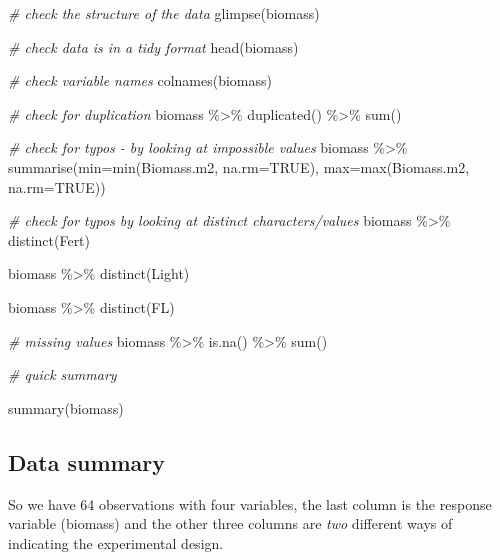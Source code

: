 \documentclass[
]{book}
\newenvironment{Shaded}{\begin{snugshade}}{\end{snugshade}}
\newcommand{\AttributeTok}[1]{\textcolor[rgb]{0.77,0.63,0.00}{#1}}
\newcommand{\CommentTok}[1]{\textcolor[rgb]{0.56,0.35,0.01}{\textit{#1}}}
\newcommand{\ConstantTok}[1]{\textcolor[rgb]{0.00,0.00,0.00}{#1}}
\newcommand{\FunctionTok}[1]{\textcolor[rgb]{0.00,0.00,0.00}{#1}}
\newcommand{\NormalTok}[1]{#1}
\newcommand{\SpecialCharTok}[1]{\textcolor[rgb]{0.00,0.00,0.00}{#1}}
\begin{document}
\begin{Shaded}
\begin{Highlighting}[]
\CommentTok{\# check the structure of the data}
\FunctionTok{glimpse}\NormalTok{(biomass)}

\CommentTok{\# check data is in a tidy format}
\FunctionTok{head}\NormalTok{(biomass)}

\CommentTok{\# check variable names}
\FunctionTok{colnames}\NormalTok{(biomass)}

\CommentTok{\# check for duplication}
\NormalTok{biomass }\SpecialCharTok{\%\textgreater{}\%} 
  \FunctionTok{duplicated}\NormalTok{() }\SpecialCharTok{\%\textgreater{}\%} 
  \FunctionTok{sum}\NormalTok{()}

\CommentTok{\# check for typos {-} by looking at impossible values}
\NormalTok{biomass }\SpecialCharTok{\%\textgreater{}\%} 
  \FunctionTok{summarise}\NormalTok{(}\AttributeTok{min=}\FunctionTok{min}\NormalTok{(Biomass.m2, }\AttributeTok{na.rm=}\ConstantTok{TRUE}\NormalTok{), }
            \AttributeTok{max=}\FunctionTok{max}\NormalTok{(Biomass.m2, }\AttributeTok{na.rm=}\ConstantTok{TRUE}\NormalTok{))}

\CommentTok{\# check for typos by looking at distinct characters/values}
\NormalTok{biomass }\SpecialCharTok{\%\textgreater{}\%} 
  \FunctionTok{distinct}\NormalTok{(Fert)}

\NormalTok{biomass }\SpecialCharTok{\%\textgreater{}\%} 
  \FunctionTok{distinct}\NormalTok{(Light)}

\NormalTok{biomass }\SpecialCharTok{\%\textgreater{}\%} 
  \FunctionTok{distinct}\NormalTok{(FL)}

\CommentTok{\# missing values}
\NormalTok{biomass }\SpecialCharTok{\%\textgreater{}\%} 
  \FunctionTok{is.na}\NormalTok{() }\SpecialCharTok{\%\textgreater{}\%} 
  \FunctionTok{sum}\NormalTok{()}

\CommentTok{\# quick summary}

\FunctionTok{summary}\NormalTok{(biomass)}
\end{Highlighting}
\end{Shaded}

\hypertarget{data-summary}{%
\subsection{Data summary}\label{data-summary}}

So we have 64 observations with four variables, the last column is the response variable (biomass) and the other three columns are \emph{two} different ways of indicating the experimental design.
\end{document}
